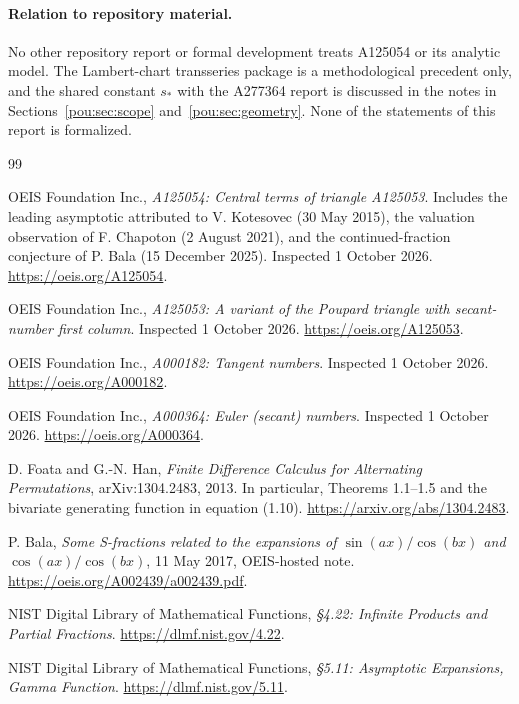 \documentclass[11pt]{article}
\theoremstyle{definition}
\theoremstyle{remark}
\begin{document}
\paragraph{Relation to repository material.} No other repository report
or formal development treats A125054 or its analytic model. The
Lambert-chart transseries package \cite{chartpath} is a methodological
precedent only, and the shared constant $s_*$ with the A277364 report
\cite{bellreport} is discussed in the notes in
Sections~\ref{pou:sec:scope} and~\ref{pou:sec:geometry}. None of the
statements of this report is formalized.

\begin{thebibliography}{99}
\small
\raggedright
\setlength{\parskip}{0pt}
\setlength{\itemsep}{0.45em}

OEIS Foundation Inc., \emph{A125054: Central terms of triangle A125053}.
Includes the leading asymptotic attributed to V. Kotesovec (30 May 2015),
the valuation observation of F. Chapoton (2 August 2021), and the
continued-fraction conjecture of P. Bala (15 December 2025).
Inspected 1 October 2026. \url{https://oeis.org/A125054}.

OEIS Foundation Inc., \emph{A125053: A variant of the Poupard triangle
with secant-number first column}.  Inspected 1 October 2026.
\url{https://oeis.org/A125053}.

OEIS Foundation Inc., \emph{A000182: Tangent numbers}.
Inspected 1 October 2026. \url{https://oeis.org/A000182}.

OEIS Foundation Inc., \emph{A000364: Euler (secant) numbers}.
Inspected 1 October 2026. \url{https://oeis.org/A000364}.

D. Foata and G.-N. Han, \emph{Finite Difference Calculus for Alternating
Permutations}, arXiv:1304.2483, 2013.  In particular, Theorems 1.1--1.5
and the bivariate generating function in equation (1.10).
\url{https://arxiv.org/abs/1304.2483}.

P. Bala, \emph{Some S-fractions related to the expansions of
$\sin(ax)/\cos(bx)$ and $\cos(ax)/\cos(bx)$}, 11 May 2017,
OEIS-hosted note. \url{https://oeis.org/A002439/a002439.pdf}.

NIST Digital Library of Mathematical Functions,
\emph{\S4.22: Infinite Products and Partial Fractions}.
\url{https://dlmf.nist.gov/4.22}.

NIST Digital Library of Mathematical Functions,
\emph{\S5.11: Asymptotic Expansions, Gamma Function}.
\url{https://dlmf.nist.gov/5.11}.


\end{thebibliography}
\end{document}
